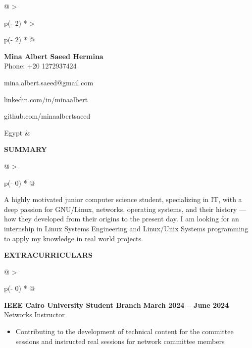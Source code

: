 \documentclass[a4paper]{article}
\begin{document}
\begin{longtable}[]{@{}
  >{\raggedright\arraybackslash}p{(\columnwidth - 2\tabcolsep) * }
  >{\raggedright\arraybackslash}p{(\columnwidth - 2\tabcolsep) * }@{}}
\textbf{\LARGE{Mina Albert Saeed Hermina}}
\vspace{1pt} \\ 
Phone: +20 1272937424

mina.albert.saeed@gmail.com

linkedin.com/in/minaalbert

github.com/minaalbertsaeed

Egypt & \\
\end{longtable}
\vspace{-10pt}

\textbf{SUMMARY}
\vspace{-8pt}
\nopagebreak[4]
\begin{longtable}[]{@{}
  >{\raggedright\arraybackslash}p{(\columnwidth - 0\tabcolsep) * }@{}}
\toprule
\vspace{0pt}
A highly motivated junior computer science student, specializing in IT,
with a deep passion for GNU/Linux, networks, operating systems, and
their history --- how they developed from their origins to the present
day. I am looking for an internship in Linux Systems Engineering and
Linux/Unix Systems programming to apply my knowledge in real world
projects.
\end{longtable}
\vspace{-8pt}

\textbf{EXTRACURRICULARS}
\vspace{-7pt}
\nopagebreak[4]
\begin{longtable}[]{@{}
  >{\raggedright\arraybackslash}p{(\columnwidth - 0\tabcolsep) * }@{} }
\toprule\noalign{}
\vspace{0pt}
    \begin{minipage}[t]{\linewidth}\raggedright
        \textbf{IEEE Cairo University Student Branch}
        \hspace{27em}\textbf{March 2024 -- June 2024} \\
        Networks Instructor
        \vspace{.05em}
        \begin{itemize}
            \item
              Contributing to the development of technical content for the committee
              sessions and instructed real sessions for network committee members
        \end{itemize}
    \end{minipage} \\
\end{longtable}
\vspace{-10pt}
\end{document}
